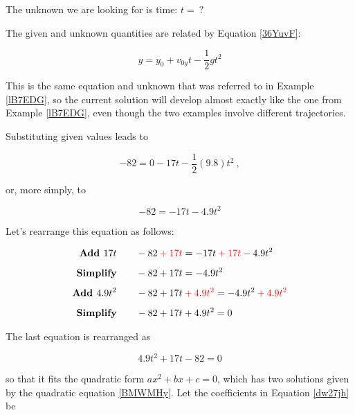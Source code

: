 \documentclass[main.tex]{subfiles}
\begin{document}
\vspace{1em}

The unknown we are looking for is time: $t =\ ?$

\vspace{1em}

The given and unknown quantities are related by Equation \eqref{36YuvF}:

\begin{equation*}
    y = y_0 + v_{0y}t - \frac{1}{2}  g t^2
\end{equation*}

This is the same equation and unknown that was referred to in Example \ref{lB7EDG}, so the current solution will develop almost exactly like the one from Example \ref{lB7EDG}, even though the two examples involve different trajectories.


\vspace{1em}

Substituting given values leads to 

\begin{equation*}
    -82 =  0 - 17 t -\frac{1}{2}(9.8) t^2\ ,
\end{equation*}

or, more simply, to

\begin{equation*}
     -82 = - 17 t -4.9 t^2
\end{equation*}

Let's rearrange this equation as follows:

\begin{align*}
    \textbf{Add $17t$} \qquad & - 82 \mathbin{\color{red} +} \textcolor{red}{17t} = -17t \mathbin{\color{red} +} \textcolor{red}{17t} - 4.9 t^2 \\[1ex]
    \textbf{Simplify} \qquad & -82 + 17t = -4.9t^2\\[1ex]
    \textbf{Add $4.9 t^2$} \qquad & -82 + 17t \mathbin{\color{red} +} \textcolor{red}{4.9 t^2} = -4.9t^2 \mathbin{\color{red} +} \textcolor{red}{4.9 t^2}\\[1ex]
    \textbf{Simplify} \qquad & -82 + 17t + 4.9t^2 = 0
\end{align*}

The last equation is rearranged as 

\begin{equation} \label{dw27jh}
    4.9 t^2 + 17t - 82 = 0
\end{equation}

so that it fits the quadratic form $ax^2 + bx + c = 0$, which has two solutions given by the quadratic equation \eqref{BMWMHy}. Let the coefficients in Equation \eqref{dw27jh} be
\end{document}
